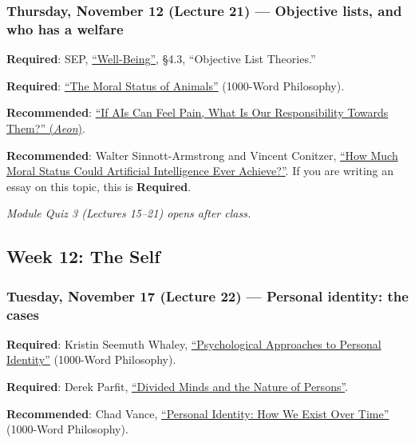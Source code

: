 \documentclass[
  letterpaper,
  DIV=11,
  numbers=noendperiod]{scrartcl}
\begin{document}
\subsubsection{Thursday, November 12 (Lecture 21) --- Objective lists,
and who has a
welfare}\label{thursday-november-12-lecture-21-objective-lists-and-who-has-a-welfare}

\textbf{Required}: SEP,
\href{https://plato.stanford.edu/entries/well-being/}{``Well-Being''},
§4.3, ``Objective List Theories.''

\textbf{Required}:
\href{https://1000wordphilosophy.com/2014/02/03/the-moral-status-of-animals/}{``The
Moral Status of Animals''} (1000-Word Philosophy).

\textbf{Recommended}:
\href{https://aeon.co/essays/if-ais-can-feel-pain-what-is-our-responsibility-towards-them}{``If
AIs Can Feel Pain, What Is Our Responsibility Towards Them?''
(\emph{Aeon})}.

\textbf{Recommended}: Walter Sinnott-Armstrong and Vincent Conitzer,
\href{https://www.cs.cmu.edu/~conitzer/AImoralstatuschapter.pdf}{``How
Much Moral Status Could Artificial Intelligence Ever Achieve?''}. If you
are writing an essay on this topic, this is \textbf{Required}.

\emph{Module Quiz 3 (Lectures 15--21) opens after class.}

\subsection{Week 12: The Self}\label{week-12-the-self}

\subsubsection{Tuesday, November 17 (Lecture 22) --- Personal identity:
the
cases}\label{tuesday-november-17-lecture-22-personal-identity-the-cases}

\textbf{Required}: Kristin Seemuth Whaley,
\href{https://1000wordphilosophy.com/2022/02/03/psychological-approaches-to-personal-identity/}{``Psychological
Approaches to Personal Identity''} (1000-Word Philosophy).

\textbf{Required}: Derek Parfit,
\href{https://rintintin.colorado.edu/~vancecd/phil375/Parfit.pdf}{``Divided
Minds and the Nature of Persons''}.

\textbf{Recommended}: Chad Vance,
\href{https://1000wordphilosophy.com/2014/02/10/personal-identity/}{``Personal
Identity: How We Exist Over Time''} (1000-Word Philosophy).
\end{document}
